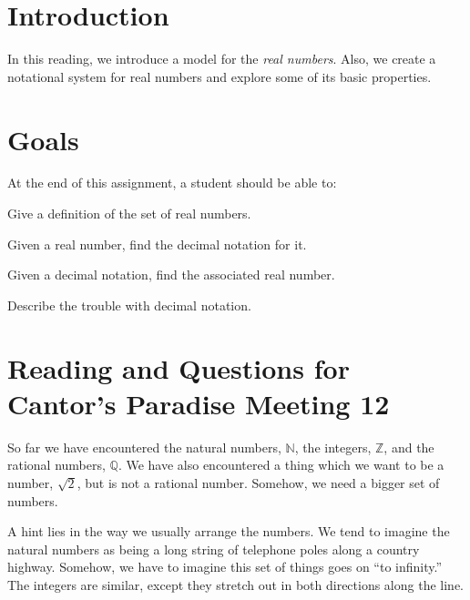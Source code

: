\documentclass[12pt,letterpaper]{article}
\theoremstyle{definition}
\begin{document}
\setlength{\parskip}{1ex plus 0.5ex minus 0.2ex}
\setlength{\parindent}{0pt}

\pagestyle{fancy}
\cfoot{}

\section*{Introduction}
In this reading, we introduce a model for the \emph{real numbers}. Also, we create a notational system for real numbers and explore some of its basic properties.

\section*{Goals}
At the end of this assignment, a student should be able to:
\begin{compactitem}
\item Give a definition of the set of real numbers.
\item Given a real number, find the decimal notation for it.
\item Given a decimal notation, find the associated real number.
\item Describe the trouble with decimal notation.
\end{compactitem}

\section*{Reading and Questions for Cantor's Paradise Meeting 12}

So far we have encountered the natural numbers, $\mathbb{N}$, the integers, $\mathbb{Z}$, and the rational numbers, $\mathbb{Q}$. 
We have also encountered a thing which we want to be a number, $\sqrt{2}$, but is not a rational number.
Somehow, we need a bigger set of numbers.

A hint lies in the way we usually arrange the numbers.
We tend to imagine the natural numbers as being a long string of telephone poles along a country highway.
Somehow, we have to imagine this set of things goes on ``to infinity.''
The integers are similar, except they stretch out in both directions along the line.
\end{document}
